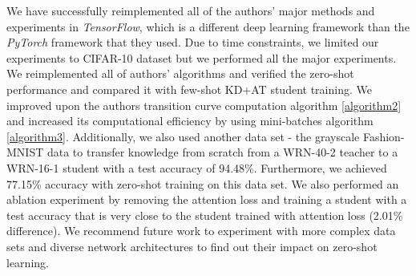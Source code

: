 \documentclass{article}
\begin{document}
We have successfully reimplemented all of the authors' major methods and experiments in \textit{TensorFlow}, which is a different deep learning framework than the \textit{PyTorch} framework that they used. Due to time constraints, we limited our experiments to CIFAR-10 dataset but we performed all the major experiments. We reimplemented all of authors' algorithms and verified the zero-shot performance and compared it with few-shot KD+AT student training. We improved upon the authors transition curve computation algorithm \ref{algorithm2} and increased its computational efficiency by using mini-batches algorithm \ref{algorithm3}. Additionally, we also used another data set - the grayscale Fashion-MNIST \cite{fashionMnist} data to transfer knowledge from scratch from a WRN-40-2 teacher to a WRN-16-1 student with a test accuracy of 94.48\%. Furthermore, we achieved 77.15\% accuracy with zero-shot training on this data set. We also performed an ablation experiment by removing the attention loss and training a student with a test accuracy that is very close to the student trained with attention loss (2.01\% difference). We recommend future work to experiment with more complex data sets and diverse network architectures to find out their impact on zero-shot learning.


\medskip


\end{document}
